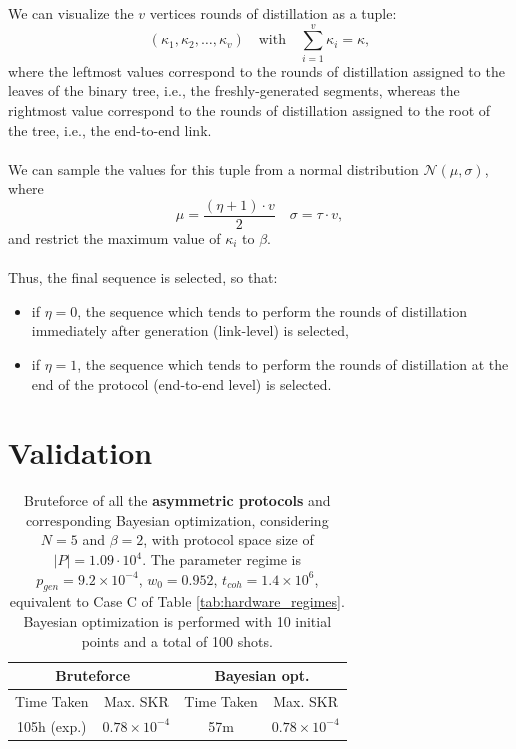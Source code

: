 \documentclass{article}
\begin{document}
We can visualize the $v$ vertices rounds of distillation as a tuple:
\begin{equation*}
    (\kappa_1, \kappa_2, \ldots, \kappa_v) \quad \text{with} \quad \sum_{i=1}^{v} \kappa_i = \kappa ,
\end{equation*}
where the leftmost values correspond to the rounds of distillation assigned to the leaves of the binary tree, i.e., the freshly-generated segments, whereas the rightmost value correspond to the rounds of distillation assigned to the root of the tree, i.e., the end-to-end link.
\\\\
We can sample the values for this tuple from a normal distribution $\mathcal{N}(\mu, \sigma)$, where
\begin{equation*}
  \mu = \frac{(\eta + 1) \cdot v}{2} \quad \sigma = \tau \cdot v ,
\end{equation*}
and restrict the maximum value of $\kappa_i$ to $\beta$.
\\\\
Thus, the final sequence is selected, so that:
\begin{itemize}
    \item if $\eta = 0$, the sequence which tends to perform the rounds of distillation immediately after generation (link-level) is selected,
    \item if $\eta = 1$, the sequence which tends to perform the rounds of distillation at the end of the protocol (end-to-end level) is selected.
\end{itemize}

\clearpage
\section*{Validation}

\begin{table}[ht!]
  \centering
  \begin{tabular}{|c|c|c|c|}
      \hline
      \multicolumn{2}{|c|}{Bruteforce} & \multicolumn{2}{c|}{Bayesian opt.} \\
      \hline
      Time Taken & Max. SKR & Time Taken & Max. SKR \\
      \hline
      \hline
      105h (exp.) & $0.78 \times 10^{-4}$ & 57m & $0.78 \times 10^{-4}$ \\
      \hline
  \end{tabular}
  \caption{Bruteforce of all the \textbf{asymmetric protocols} and corresponding Bayesian optimization, considering $N=5$ and $\beta=2$, with protocol space size of $|P| = 1.09 \cdot 10^4$. The parameter regime is $p_{gen} = 9.2 \times 10^{-4}$, $w_0 = 0.952$, $t_{coh} = 1.4 \times 10^6$, equivalent to Case C of Table \ref{tab:hardware_regimes}. Bayesian optimization is performed with 10 initial points and a total of 100 shots.}
  \label{tab:validation_regimes}
\end{table}
\end{document}
